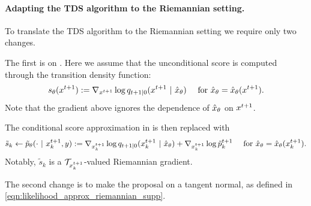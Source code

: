 \paragraph{Adapting the TDS algorithm to the Riemannian setting.}
To translate the TDS algorithm to the Riemannian setting we require only two changes.

The first is on  
.
Here we assume that the unconditional score is computed through the transition density function: 
\begin{align}
s_\theta(x^{t+1}) := \nabla_{x^{t+1}} \log q_{t+1{|}0}(x^{t+1}~\vert~ {\hat x}_\theta) \quad \mathrm{\ for\ } {\hat x}_\theta = {\hat x}_\theta(x^{t+1}).
\end{align}
Note that the gradient above ignores the dependence of ${\hat x}_\theta$ on $x^{t+1}$. 

The conditional score approximation in  is then replaced with 
$$
\tilde s_k \leftarrow \tilde p_\theta (\cdot ~\vert~ x^{t+1}_k, y):= \nabla_{x^{t+1}_k} \log q_{t+1{|} 0}(x^{t+1}_k~\vert~ {\hat x}_\theta) + \nabla_{x^{t+1}_k} \log \tilde p_k^{t+1} \quad \mathrm{ \ for\  } {\hat x}_\theta = {\hat x}_\theta(x^{t+1}_k).
$$
Notably, $\tilde s_k$ is a $\mathcal{T}_{x^{t+1}_k}$-valued Riemannian gradient.

The second change is to make the proposal on   a tangent normal, as defined in \cref{eqn:likelihood_approx_riemannian_supp}.